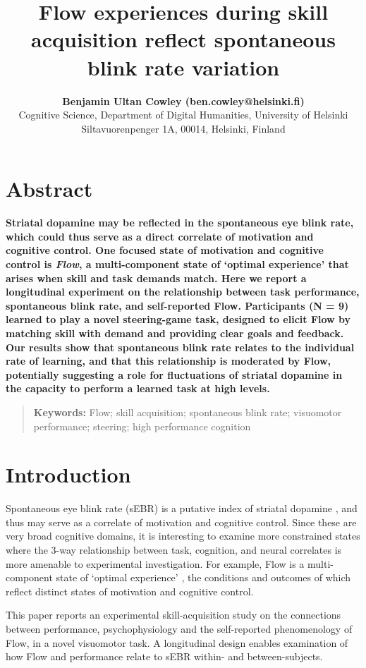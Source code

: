 \documentclass[10pt,letterpaper,floatsintext]{article}
\title{Flow experiences during skill acquisition reflect spontaneous blink rate variation}
\author{{\large \bf Benjamin Ultan Cowley (ben.cowley@helsinki.fi)} \\
  Cognitive Science, Department of Digital Humanities, University of Helsinki \\ Siltavuorenpenger 1A, 00014, Helsinki, Finland
  \AND {\large \bf Roosa Frantsi (roosa.frantsi@helsinki.fi)}
  \AND {\large \bf Pasi P\"{o}l\"{o}nen (pasi.polonen@helsinki.fi)}
  \AND {\large \bf Ville-Pekka Inkil\"{a} (ville-pekka.inkile@helsinki.fi)}
  }
\begin{document}
\maketitle


\section{Abstract}
{
\bf
Striatal dopamine may be reflected in the spontaneous eye blink rate, which could thus serve as a direct correlate of motivation and cognitive control. One focused state of motivation and cognitive control is \textit{Flow}, a multi-component state of `optimal experience' that arises when skill and task demands match. Here we report a longitudinal experiment on the relationship between task performance, spontaneous blink rate, and self-reported Flow. Participants (N = 9) learned to play a novel steering-game task, designed to elicit Flow by matching skill with demand and providing clear goals and feedback. Our results show that spontaneous blink rate relates to the individual rate of learning, and that this relationship is moderated by Flow, potentially suggesting a role for fluctuations of striatal dopamine in the capacity to perform a learned task at high levels.
}
\begin{quote}
\small
\textbf{Keywords:}
Flow; skill acquisition; spontaneous blink rate; visuomotor performance; steering; high performance cognition
\end{quote}


\section{Introduction}

Spontaneous eye blink rate (sEBR) is a putative index of striatal dopamine \cite{Slagter2012}, and thus may serve as a correlate of motivation and cognitive control. Since these are very broad cognitive domains, it is interesting to examine more constrained states where the 3-way relationship between task, cognition, and neural correlates is more amenable to experimental investigation. For example, Flow is a multi-component state of `optimal experience' \cite{Csikszentmihalyi1975}, the conditions and outcomes of which reflect distinct states of motivation and cognitive control.

This paper reports an experimental skill-acquisition study on the connections between performance, psychophysiology and the self-reported phenomenology of Flow, in a novel visuomotor task. A longitudinal design enables examination of how Flow and performance relate to sEBR within- and between-subjects.
\end{document}
